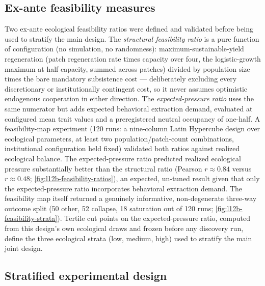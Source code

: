 \subsection{Ex-ante feasibility measures}
\label{sec:level12b-feasibility}

Two ex-ante ecological feasibility ratios were defined and validated
before being used to stratify the main design. The
\textit{structural feasibility ratio} is a pure function of configuration
(no simulation, no randomness): maximum-sustainable-yield regeneration
(patch regeneration rate times capacity over four, the logistic-growth
maximum at half capacity, summed across patches) divided by population
size times the bare mandatory subsistence cost --- deliberately excluding
every discretionary or institutionally contingent cost, so it never
assumes optimistic endogenous cooperation in either direction. The
\textit{expected-pressure ratio} uses the same numerator but adds expected
behavioral extraction demand, evaluated at configured mean trait values
and a preregistered neutral occupancy of one-half. A feasibility-map
experiment (120 runs: a nine-column Latin Hypercube design over ecological
parameters, at least two population/patch-count combinations, institutional
configuration held fixed) validated both ratios against realized ecological
balance. The expected-pressure ratio predicted realized ecological pressure
substantially better than the structural ratio (Pearson $r\approx0.84$
versus $r\approx0.48$; \cref{fig:l12b-feasibility-ratios}), an expected,
un-tuned result given that only the expected-pressure ratio incorporates
behavioral extraction demand. The feasibility map itself returned a
genuinely informative, non-degenerate three-way outcome split (50 other,
52 collapse, 18 saturation out of 120 runs; \cref{fig:l12b-feasibility-strata}).
Tertile cut points on the expected-pressure ratio, computed from this
design's own ecological draws and frozen before any discovery run, define
the three ecological strata (low, medium, high) used to stratify the main
joint design.

\subsection{Stratified experimental design}
\label{sec:level12b-design}

